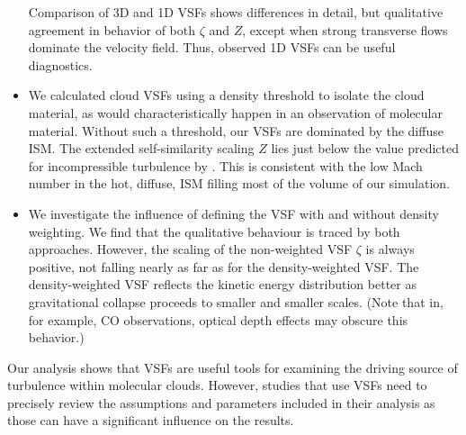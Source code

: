 \begin{itemize}
     Comparison of 3D and 1D VSFs shows differences in detail, but qualitative 
     agreement in behavior of both $\zeta$ and $Z$, except when strong transverse 
     flows dominate the velocity field. Thus, observed 1D VSFs can be useful diagnostics. 
\item %
    We calculated cloud VSFs using a density threshold to isolate the cloud material, 
    as would characteristically happen in an observation of molecular material. 
    Without such a threshold, our VSFs are dominated by the diffuse ISM.  The 
    extended self-similarity scaling $Z$ lies just below the value predicted 
    for incompressible turbulence by \citet{She1994}. This is consistent with the
    low Mach number in the hot, diffuse, ISM filling most of the volume of our simulation.
\item We investigate the influence of defining the VSF with and without density weighting. We find that the qualitative behaviour is traced by both approaches. However, the scaling of the non-weighted VSF $\zeta$ is always positive, 
   not falling nearly as far as for the
density-weighted VSF. 
    The density-weighted VSF reflects the kinetic energy distribution better as 
    gravitational collapse proceeds to smaller and smaller scales.  (Note that in, 
    for example, CO observations, optical depth effects may obscure this behavior.) 
\end{itemize}

Our analysis shows that VSFs are 
    useful
tools for examining the driving source of turbulence within molecular clouds.
However, studies that use VSFs need to precisely review the assumptions and parameters %
   included
in their analysis as those can have a significant influence on the 
results.


